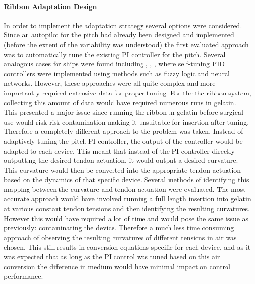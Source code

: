 \paragraph*{Ribbon Adaptation Design }
In order to implement the adaptation strategy several options were considered. Since an autopilot for the pitch had already been designed and implemented (before the extent of the variability was understood) the first evaluated approach was to automatically tune the existing PI controller for the pitch. Several analogous cases for ships were found including \cite{puntunan_online_2006}, \cite{tomera_fuzzy_2017}, \cite{zhang_-line_2020}, \cite{tung_self-tuning_2023} where self-tuning PID controllers were implemented using methods such as fuzzy logic and neural networks. However, these approaches were all quite complex and more importantly required extensive data for proper tuning. For the the ribbon system, collecting this amount of data would have required numerous runs in gelatin. This presented a major issue since running the ribbon in gelatin before surgical use would risk risk contamination making it unsuitable for insertion after tuning. 
\newline \newline
Therefore a completely different approach to the problem was taken. Instead of adaptively tuning the pitch PI controller, the output of the controller would be adapted to each device. This meant that instead of the PI controller directly outputting the desired tendon actuation, it would output a desired curvature. This curvature would then be converted into the appropriate tendon actuation based on the dynamics of that specific device.
\newline \newline
Several methods of identifying this mapping between the curvature and tendon actuation were evaluated. The most accurate approach would have involved running a full length insertion into gelatin at various constant tendon tensions and then identifying the resulting curvatures. However this would have required a lot of time and would pose the same issue as previously: contaminating the device. Therefore a much less time consuming approach of observing the resulting curvatures of different tensions in air was chosen. This still results in conversion equations specific for each device, and as it was expected that as long as the PI control was  tuned based on this air conversion the difference in medium would have minimal impact on control performance.

